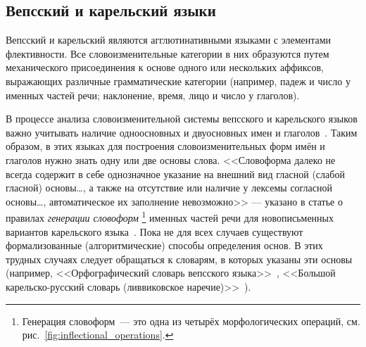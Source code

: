 \newpage


\subsection{Вепсский и карельский языки}\label{sect_review_veps_karelian}

Вепсский и карельский являются агглютинативными языками с элементами флективности. 
Все словоизменительные категории в них образуются путем механического присоединения 
к основе одного или нескольких аффиксов, выражающих различные грамматические 
категории (например, падеж и число у именных частей речи; наклонение, время, лицо и число у глаголов). 

%
%
%

В процессе анализа словоизменительной системы вепсского и карельского языков 
важно учитывать наличие одноосновных и двуосновных имен и глаголов~\cite[57]{KrlNovak2019PeoplesOfKarelia}.
Таким образом, в этих языках для построения словоизменительных форм имён и глаголов 
нужно знать одну или две основы слова. 
%
<<Словоформа далеко не всегда содержит в себе однозначное указание 
на внешний вид гласной (слабой гласной) основы\ldots, 
а также на отсутствие или наличие у лексемы согласной основы\ldots, 
автоматическое их заполнение невозможно>> --- указано в статье 
о правилах \emph{генерации словоформ}%
%
\footnote{Генерация словоформ~--- это одна из четырёх морфологических операций, 
см. рис.~\ref{fig:inflectional_operations}.} %
%
именных частей речи 
для новописьменных вариантов карельского языка~\cite[684]{rulesNominalKrl2020NovakUgricStudies}.
%
Пока не для всех случаев существуют формализованные (алгоритмические) способы определения основ. 
В этих трудных случаях следует обращаться к словарям, в которых указаны эти основы 
(например, <<Орфографический словарь вепсского языка>>~\cite{ZaitsevaNG2012OrphDict}, 
<<Большой карельско-русский словарь (ливвиковское наречие)>>~\cite{Boiko2019livvi}).

